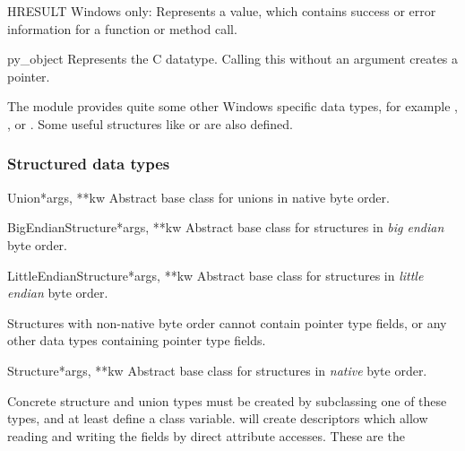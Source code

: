 \begin{classdesc*}{HRESULT}
Windows only: Represents a  value, which contains success
or error information for a function or method call.
\end{classdesc*}

\begin{classdesc*}{py_object}
Represents the C  datatype.  Calling this without an
argument creates a   pointer.
\end{classdesc*}

The  module provides quite some other Windows
specific data types, for example , , or .
Some useful structures like  or  are also defined.


\subsubsection{Structured data types\label{ctypes-structured-data-types}}

\begin{classdesc}{Union}{*args, **kw}
Abstract base class for unions in native byte order.
\end{classdesc}

\begin{classdesc}{BigEndianStructure}{*args, **kw}
Abstract base class for structures in \emph{big endian} byte order.
\end{classdesc}

\begin{classdesc}{LittleEndianStructure}{*args, **kw}
Abstract base class for structures in \emph{little endian} byte order.
\end{classdesc}

Structures with non-native byte order cannot contain pointer type
fields, or any other data types containing pointer type fields.

\begin{classdesc}{Structure}{*args, **kw}
Abstract base class for structures in \emph{native} byte order.
\end{classdesc}

Concrete structure and union types must be created by subclassing one
of these types, and at least define a  class variable.
 will create descriptors which allow reading and writing the
fields by direct attribute accesses.  These are the

